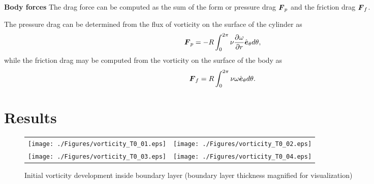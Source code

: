 {\bf Body forces}
The drag force can be computed as the sum of the form or pressure drag $\boldsymbol{F}_p$ and the friction drag $\boldsymbol{F}_f$.

The pressure drag can be determined from the flux of vorticity on the surface of the cylinder as
\begin{align}
\boldsymbol{F}_p = -R \int_0^{2\pi} \nu \frac{\partial \omega}{\partial r} \hat{\boldsymbol{e}}_{\theta} d\theta,
\end{align}
while the friction drag may be computed from the vorticity on the surface of the body as
\begin{align}
\boldsymbol{F}_f = R \int_0^{2\pi} \nu \omega \hat{\boldsymbol{e}}_{\theta} d\theta.
\end{align}


\section{Results}


\begin{figure}
\begin{center}
\begin{tabular}[t]{cc}
\texttt{[image: ./Figures/vorticity\_T0\_01.eps]} & 
\texttt{[image: ./Figures/vorticity\_T0\_02.eps]}  \\
\texttt{[image: ./Figures/vorticity\_T0\_03.eps]} & 
\texttt{[image: ./Figures/vorticity\_T0\_04.eps]} 
\end{tabular}
\end{center}
\caption[Initial vorticity profile inside boundary layer]{Initial vorticity development inside boundary layer (boundary layer thickness magnified for visualization)}
\label{fig:initialvorticity}
\end{figure}


